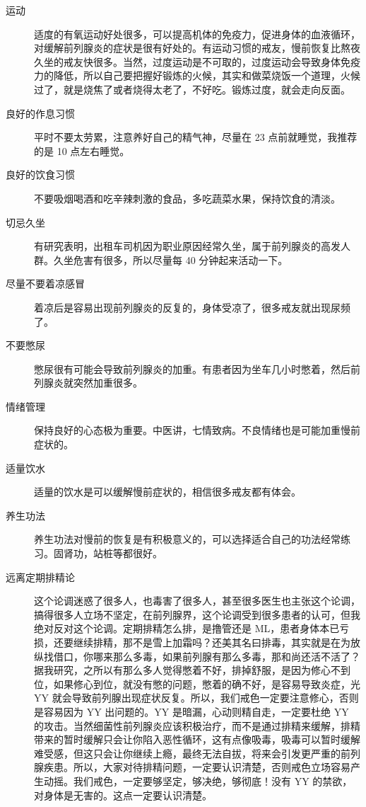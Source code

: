 \documentclass{ctexart}
\begin{document}
\begin{description}
    \item [运动] 适度的有氧运动好处很多，可以提高机体的免疫力，促进身体的血液循环，对缓解前列腺炎的症状是很有好处的。有运动习惯的戒友，慢前恢复比熬夜久坐的戒友快很多。当然，过度运动是不可取的，过度运动会导致身体免疫力的降低，所以自己要把握好锻炼的火候，其实和做菜烧饭一个道理，火候过了，就是烧焦了或者烧得太老了，不好吃。锻炼过度，就会走向反面。
    \item [良好的作息习惯] 平时不要太劳累，注意养好自己的精气神，尽量在 23 点前就睡觉，我推荐的是 10 点左右睡觉。
    \item [良好的饮食习惯] 不要吸烟喝酒和吃辛辣刺激的食品，多吃蔬菜水果，保持饮食的清淡。
    \item [切忌久坐] 有研究表明，出租车司机因为职业原因经常久坐，属于前列腺炎的高发人群。久坐危害有很多，所以尽量每 40 分钟起来活动一下。
    \item [尽量不要着凉感冒] 着凉后是容易出现前列腺炎的反复的，身体受凉了，很多戒友就出现尿频了。
    \item [不要憋尿] 憋尿很有可能会导致前列腺炎的加重。有患者因为坐车几小时憋着，然后前列腺炎就突然加重很多。
    \item [情绪管理] 保持良好的心态极为重要。中医讲，七情致病。不良情绪也是可能加重慢前症状的。
    \item [适量饮水] 适量的饮水是可以缓解慢前症状的，相信很多戒友都有体会。
    \item [养生功法] 养生功法对慢前的恢复是有积极意义的，可以选择适合自己的功法经常练习。固肾功，站桩等都很好。
    \item [远离定期排精论] 这个论调迷惑了很多人，也毒害了很多人，甚至很多医生也主张这个论调，搞得很多人立场不坚定，在前列腺界，这个论调受到很多患者的认可，但我绝对反对这个论调。定期排精怎么排，是撸管还是 ML，患者身体本已亏损，还要继续排精，那不是雪上加霜吗？还美其名曰排毒，其实就是在为放纵找借口，你哪来那么多毒，如果前列腺有那么多毒，那和尚还活不活了？据我研究，之所以有那么多人觉得憋着不好，排掉舒服，是因为修心不到位，如果修心到位，就没有憋的问题，憋着的确不好，是容易导致炎症，光 YY 就会导致前列腺出现症状反复。所以，我们戒色一定要注意修心，否则是容易因为 YY 出问题的。YY 是暗漏，心动则精自走，一定要杜绝 YY 的攻击。当然细菌性前列腺炎应该积极治疗，而不是通过排精来缓解，排精带来的暂时缓解只会让你陷入恶性循环，这有点像吸毒，吸毒可以暂时缓解难受感，但这只会让你继续上瘾，最终无法自拔，将来会引发更严重的前列腺疾患。所以，大家对待排精问题，一定要认识清楚，否则戒色立场容易产生动摇。我们戒色，一定要够坚定，够决绝，够彻底！没有 YY 的禁欲，对身体是无害的。这点一定要认识清楚。
\end{description}
\end{document}
